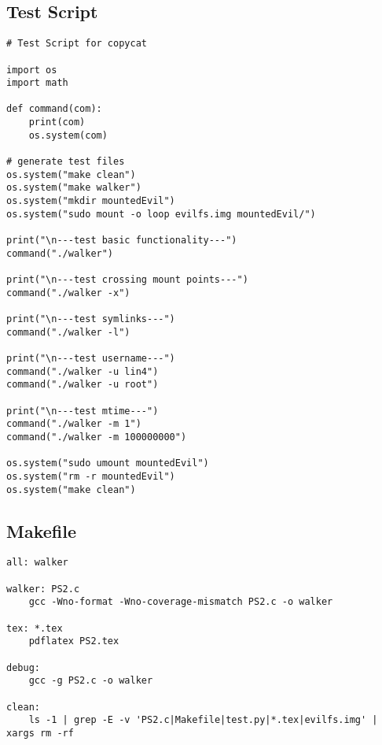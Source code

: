 \documentclass[12pt]{article}
\begin{document}
\subsection{Test Script}
\begin{lstlisting}
# Test Script for copycat

import os
import math

def command(com):
	print(com)
	os.system(com)

# generate test files
os.system("make clean")
os.system("make walker")
os.system("mkdir mountedEvil")
os.system("sudo mount -o loop evilfs.img mountedEvil/")

print("\n---test basic functionality---")
command("./walker")

print("\n---test crossing mount points---")
command("./walker -x")

print("\n---test symlinks---")
command("./walker -l")

print("\n---test username---")
command("./walker -u lin4")
command("./walker -u root")

print("\n---test mtime---")
command("./walker -m 1")
command("./walker -m 100000000")

os.system("sudo umount mountedEvil")
os.system("rm -r mountedEvil")
os.system("make clean")
\end{lstlisting}
\subsection{Makefile}

\begin{lstlisting}
all: walker

walker: PS2.c
	gcc -Wno-format -Wno-coverage-mismatch PS2.c -o walker

tex: *.tex
	pdflatex PS2.tex

debug:
	gcc -g PS2.c -o walker

clean:
	ls -1 | grep -E -v 'PS2.c|Makefile|test.py|*.tex|evilfs.img' | xargs rm -rf
\end{lstlisting}
\end{document}
